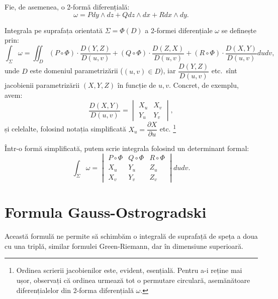 Fie, de asemenea, o 2-formă diferențială\footnotemark:
\[
  \omega = P dy\wedge dz + Q dz \wedge dx + R dx \wedge dy.
\]


Integrala pe suprafața orientată $ \Sigma = \Phi(D) $ a 2-formei diferențiale
$ \omega $ se definește prin:
\[
  \int_\Sigma \omega = \iint_D (P \circ \Phi) \cdot \frac{D(Y,Z)}{D(u, v)} + %
  (Q \circ \Phi) \cdot \frac{D(Z, X)}{D(u, v)} + %
  (R \circ \Phi) \cdot \frac{D(X, Y)}{D(u, v)} dudv,
\]
unde $ D $ este domeniul parametrizării ($(u, v) \in D$),
iar $ \dfrac{D(Y, Z)}{D(u, v)} $ etc.\ sînt jacobienii parametrizării
$ (X, Y, Z) $ în funcție de $ u, v $. Concret, de exemplu, avem:
\[
  \frac{D(X, Y)}{D(u, v)} = %
  \begin{vmatrix}
    X_u & X_v \\
    Y_u & Y_v
  \end{vmatrix},
\]
și celelalte, folosind notația simplificată $ X_u = \dfrac{\partial X}{\partial u} $ etc.
\footnote{Ordinea scrierii jacobienilor este, evident, esențială. Pentru
  a-i reține mai ușor, observați că ordinea urmează tot o permutare circulară,
  asemănătoare diferențialelor din 2-forma diferențială $ \omega $.}

Într-o formă simplificată, putem scrie integrala folosind un determinant formal:
\[
  \int_\Sigma \omega = %
  \begin{vmatrix}
    P \circ \Phi & Q \circ \Phi & R \circ \Phi \\
    X_u & Y_u & Z_u \\
    X_v & Y_v & Z_v
  \end{vmatrix} dudv.
\]


\section{Formula Gauss-Ostrogradski}
Această formulă ne permite să schimbăm o integrală de suprafață de speța
a doua cu una triplă, similar formulei Green-Riemann, dar în dimensiune
superioară.

